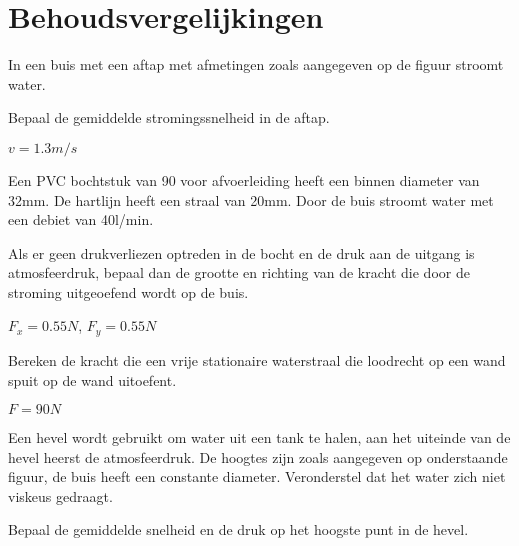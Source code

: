 \chapter{Behoudsvergelijkingen}
\label{sec:Behoudsvergelijkingen}
	\begin{toepassing}
		\label{buisaftap}
In een buis met een aftap met afmetingen zoals aangegeven op de figuur stroomt water.
		
Bepaal de gemiddelde stromingssnelheid in de aftap.
		\begin{center}
			
		\end{center}
	\end{toepassing}
	\begin{antwoord}
		$v = \unit{1.3}{m/s}$
	\end{antwoord}
	\begin{toepassing}
		\label{afvoerbocht}
Een PVC bochtstuk van \unit{90}{\degree} voor afvoerleiding heeft een binnen diameter van \unit{32}{mm}. De hartlijn heeft een straal van \unit{20}{mm}. Door de buis stroomt water met een debiet van \unit{40}{l/min}.
		
Als er geen drukverliezen optreden in de bocht en de druk aan de uitgang is atmosfeerdruk, bepaal dan de grootte en richting van de kracht die door de stroming uitgeoefend wordt op de buis.
		\begin{center}
			
		\end{center}
	\end{toepassing}
	\begin{antwoord}
		$F_x = \unit{0.55}{N}$, $F_y = \unit{0.55}{N}$
	\end{antwoord}
	\begin{toepassing*}
		\label{waterstraal}
Bereken de kracht die een vrije stationaire waterstraal die loodrecht op een wand spuit op de wand uitoefent.
		\begin{center}
			
		\end{center}
	\end{toepassing*}
	\begin{antwoord}
		$F = \unit{90}{N}$
	\end{antwoord}
	\begin{toepassing*}
		\label{hevel}
Een hevel wordt gebruikt om water uit een tank te halen, aan het uiteinde van de hevel heerst de atmosfeerdruk. De hoogtes zijn zoals aangegeven op onderstaande figuur, de buis heeft een constante diameter. Veronderstel dat het water zich niet viskeus gedraagt.
		
Bepaal de gemiddelde snelheid en de druk op het hoogste punt in de hevel.
		\begin{center}
			
		\end{center}
	\end{toepassing*}
